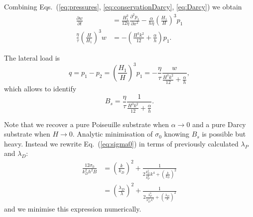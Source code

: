 \documentclass[12pt,a4paper]{revtex4}
\begin{document}
Combining Eqs.~(\ref{eq:pressures}, \ref{eq:conservationDarcy}, \ref{eq:Darcy}) we obtain
\begin{align}
\frac{\partial w}{\partial t} &= \frac{H_1^3}{12\eta} \frac{\partial^2 p_1}{\partial x^2} - \frac{\alpha}{h\eta} \left(\frac{H_1}{H}\right)^3 p_1\\
\frac{\eta}{\tau}\left(\frac{H}{H_1}\right)^3 w &= -\left(\frac{H^3 k^2}{12} + \frac{\alpha}{h}\right)p_1.
\end{align}

The lateral load is
\begin{equation}
q = p_1-p_2 = \left(\frac{H_1}{H}\right)^3 p_1 = - \frac{\eta}{\tau} \frac{w}{\frac{H^3 k^2}{12} + \frac{\alpha}{h}},
\end{equation}
which allows to identify 
\begin{equation}
B_s = \frac{\eta}{\tau}\frac{1}{\frac{H^3 k^2}{12} + \frac{\alpha}{h}}.
\end{equation}

Note that we recover a pure Poiseuille substrate when $\alpha \rightarrow 0$ and a pure Darcy substrate when $H \rightarrow 0$. Analytic minimisation of $\sigma_0$ knowing $B_s$ is possible but heavy. Instead we rewrite Eq.~(\ref{eq:sigma0}) in terms of previously calculated $\lambda_P$ and $\lambda_D$:
\begin{align}
\frac{12\sigma_0}{k_D^2 h^2 B} &= \left(\frac{k}{k_D}\right)^2 + \frac{1}{2\frac{k_D^2}{k_P^6}k^4  + \left(\frac{k}{k_D}\right)^2}\\
&= \left(\frac{\lambda_D}{\lambda}\right)^2 + \frac{1}{2\frac{\lambda_P^6}{\lambda_D^2\lambda^4}  + \left(\frac{\lambda_D}{\lambda}\right)^2}
\end{align}
and we minimise this expression numerically.




\end{document}
